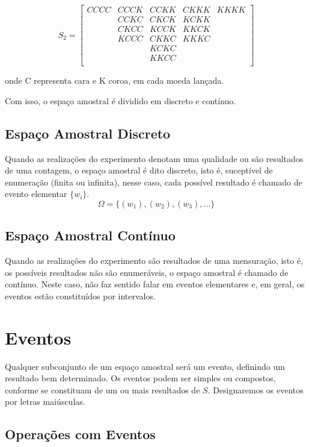$$
S_{2} =
\left[%
\begin{array}{ccccc}
  CCCC  & CCCK  & CCKK  & CKKK  & KKKK \\
        & CCKC  & CKCK  & KCKK  &      \\
        & CKCC  & KCCK  & KKCK  &      \\
        & KCCC  & CKKC  & KKKC  &      \\
        &       & KCKC  &       &      \\
        &       & KKCC  &       &      \\
\end{array}%
\right]
$$

onde C representa cara e K coroa, em cada moeda
lançada.\vskip0.3cm

Com isso, o espaço amostral é dividido em discreto e contínuo.


\subsection{Espaço Amostral Discreto}

Quando as realizações do experimento denotam uma qualidade ou são
resultados de uma contagem, o espaço amostral é dito discreto,
isto é, suceptível de enumeração (finita ou infinita), nesse caso,
cada possível resultado é chamado de evento elementar $\{w_{i}\}$.
$$ \Omega = \{ (w_{1}),(w_{2}),(w_{3}),... \}  $$


\subsection{Espaço Amostral Contínuo}

Quando as realizações do experimento são resultados de uma
mensuração, isto é, os possíveis resultados não são enumeráveis, o
espaço amostral é chamado de contínuo. Neste caso, não faz sentido
falar em eventos elementares e, em geral, os eventos estão
constituídos por intervalos.


\section{Eventos}

Qualquer subconjunto de um espaço amostral será um evento,
definindo um resultado bem determinado. Os eventos podem ser
simples ou compostos, conforme se constituam de um ou mais
resultados de $S$. Designaremos os eventos por letras maiúsculas.


\subsection{Operações com Eventos}


